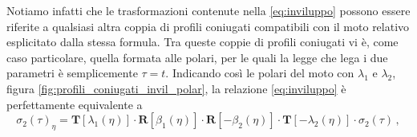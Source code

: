 \noindent Notiamo infatti che le trasformazioni contenute nella
\ref{eq:inviluppo} possono essere riferite a qualsiasi altra coppia di
profili coniugati compatibili con il moto relativo
esplicitato dalla stessa formula. Tra queste coppie di profili
coniugati vi \`e, come caso particolare, quella formata alle polari,
per le quali la legge che lega i due parametri \`e semplicemente
$\tau=t$.
Indicando cos\`i le polari del moto con $\lambda_1$ e $\lambda_2$,
figura \ref{fig:profili_coniugati_invil_polar},
la relazione \ref{eq:inviluppo} \`e perfettamente equivalente a
\begin{equation}
{\sigma_2(\tau)}_\eta = 
 {\bm T}[\lambda_1(\eta)]\cdot {\bm R}[\beta_1(\eta)]\cdot{\bm R}[-\beta_2(\eta)]\cdot
 {\bm T} [-\lambda_2(\eta)]\cdot \sigma_2(\tau)\,,
\label{eq:inviluppo_polar}
\end{equation}


